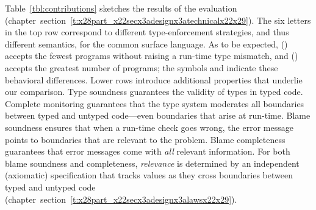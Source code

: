 \documentclass[ twoside,open=right,titlepage,numbers=noenddot,headinclude,%
                footinclude=true,cleardoublepage=empty,abstract=off,
                BCOR=5mm,paper=a4,fontsize=11pt,%
                ngerman,american,%
                parts,pdfspacing]{scrreprt}
\newcommand{\SecRef}[2]{section~#1}
\newcommand{\SecRefLocal}[3]{\hyperref[#1]{\SecRef{#2}{#3}}}
\renewcommand{\SecRefLocal}[3]{section~\ref{#1}}
\begin{document}

Table~\ref{tbl:contributions} sketches the results of the evaluation (chapter~\SecRefLocal{t:x28part_x22secx3adesignx3atechnicalx22x29}{4.5}{Technical Development}).
The six letters in the top row correspond to different type{-}enforcement strategies,
 and thus different semantics, for the common surface language.
As to be expected, \relax{\nname} (\relax{$\nscr$}) accepts the fewest programs without raising a run{-}time
 type mismatch, and \relax{\ename} (\relax{$\escr$}) accepts the greatest number
 of programs;
 the symbols \relax{$\sbehaviorle$} and \relax{$\sbehavioreq$} indicate these
 behavioral differences.
Lower rows introduce additional properties that underlie our comparison.
Type soundness guarantees the validity of types in typed code.
Complete monitoring guarantees that the type system moderates all boundaries between
 typed and untyped code{---}even boundaries that arise at run{-}time.
Blame soundness ensures that when a run{-}time check goes wrong, the error message
 points to boundaries that are relevant to the problem.
Blame completeness guarantees that error messages come with \emph{all} relevant
 information.
For both blame soundness and completeness, \emph{relevance} is determined by an
 independent (axiomatic) specification that tracks values as they cross
 boundaries between typed and untyped code (chapter~\SecRefLocal{t:x28part_x22secx3adesignx3alawsx22x29}{4.4.4.1}{How to lift a reduction relation}).
\end{document}

